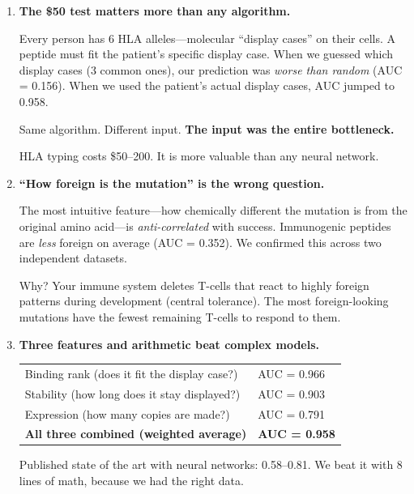 \documentclass[12pt]{article}
\begin{document}
\begin{enumerate}[leftmargin=*,itemsep=6pt]

\item \textbf{The \$50 test matters more than any algorithm.}

Every person has 6 HLA alleles---molecular ``display cases'' on their cells. A peptide must fit the patient's specific display case. When we guessed which display cases (3 common ones), our prediction was \textit{worse than random} (AUC = 0.156). When we used the patient's actual display cases, AUC jumped to 0.958.

Same algorithm. Different input. \textbf{The input was the entire bottleneck.}

HLA typing costs \$50--200. It is more valuable than any neural network.

\item \textbf{``How foreign is the mutation'' is the wrong question.}

The most intuitive feature---how chemically different the mutation is from the original amino acid---is \textit{anti-correlated} with success. Immunogenic peptides are \textit{less} foreign on average (AUC = 0.352). We confirmed this across two independent datasets.

Why? Your immune system deletes T-cells that react to highly foreign patterns during development (central tolerance). The most foreign-looking mutations have the fewest remaining T-cells to respond to them.

\item \textbf{Three features and arithmetic beat complex models.}

\vspace{4pt}
\begin{tabular}{ll}
Binding rank (does it fit the display case?) & AUC = 0.966 \\
Stability (how long does it stay displayed?) & AUC = 0.903 \\
Expression (how many copies are made?) & AUC = 0.791 \\
\textbf{All three combined (weighted average)} & \textbf{AUC = 0.958} \\
\end{tabular}
\vspace{4pt}

Published state of the art with neural networks: 0.58--0.81. We beat it with 8 lines of math, because we had the right data.

\end{enumerate}
\end{document}
